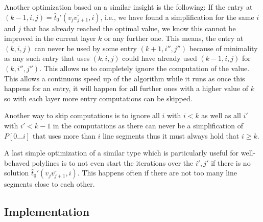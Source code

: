 Another optimization based on a similar insight is the following: If the entry at \((k-1, i, j) = \hat t_0'(\overline{v_{j}v_{j+1}}, i)\), i.e., we have found a simplification for the same \(i\) and \(j\) that has already reached the optimal value, we know this cannot be improved in the current layer \(k\) or any further one. This means, the entry at \((k, i, j)\) can never be used by some entry \((k + 1, i'', j'')\) because of minimality as any such entry that uses \((k, i, j)\) could have already used \((k-1, i, j)\) for \((k, i'', j'')\). This allows us to completely ignore the computation of the value. This allows a continuous speed up of the algorithm while it runs as once this happens for an entry, it will happen for all further ones with a higher value of \(k\) so with each layer more entry computations can be skipped. 

Another way to skip computations is to ignore all \(i\) with \(i < k\) as well as all \(i'\) with \(i' < k - 1\) in the computations as there can never be a simplification of \(P[0\dots i]\) that uses more than \(i\) line segments thus it must always hold that \(i \geq k\). 

A last simple optimization of a similar type which is particularly useful for well-behaved polylines is to not even start the iterations over the \(i', j'\) if there is no solution \(\hat t_0'(\overline{v_{j}v_{j+1}}, i)\). This happens often if there are not too many line segments close to each other.












\subsection{Implementation}
\label{subsec:implementation}
%


